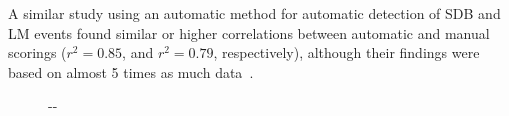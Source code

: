 A similar study using an automatic method for automatic detection of \ac{SDB} and \ac{LM} events found similar or higher correlations between automatic and manual scorings (\(r^2 = 0.85\), and \(r^2 = 0.79\), respectively), although their findings were based on almost 5 times as much data~\cite{Biswal2018}.

\begin{figure}
    \begin{adjustwidth*}{}{-\marginparwidth-\marginparsep}
    \myfloatalign   
    \\

\end{adjustwidth*}
\end{figure}
